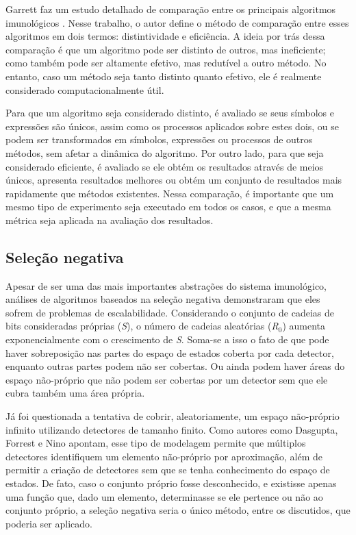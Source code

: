 Garrett faz um estudo detalhado de comparação entre os principais algoritmos imunológicos \cite{Garrett2005}. Nesse trabalho, o autor define o método de comparação entre esses algoritmos em dois termos: distintividade e eficiência. A ideia por trás dessa comparação é que um algoritmo pode ser distinto de outros, mas ineficiente; como também pode ser altamente efetivo, mas redutível a outro método. No entanto, caso um método seja tanto distinto quanto efetivo, ele é realmente considerado computacionalmente útil.

Para que um algoritmo seja considerado distinto, é avaliado se seus símbolos e expressões são únicos, assim como os processos aplicados sobre estes dois, ou se podem ser transformados em símbolos, expressões ou processos de outros métodos, sem afetar a dinâmica do algoritmo. Por outro lado, para que seja considerado eficiente, é avaliado se ele obtém os resultados através de meios únicos, apresenta resultados melhores ou obtém um conjunto de resultados mais rapidamente que métodos existentes. Nessa comparação, é importante que um mesmo tipo de experimento seja executado em todos os casos, e que a mesma métrica seja aplicada na avaliação dos resultados.

\subsection{Seleção negativa}

Apesar de ser uma das mais importantes abstrações do sistema imunológico, análises de algoritmos baseados na seleção negativa demonstraram que eles sofrem de problemas de escalabilidade. Considerando o conjunto de cadeias de bits consideradas próprias (\emph{S}), o número de cadeias aleatórias (\emph{R$_{0}$}) aumenta exponencialmente com o crescimento de \emph{S}. Soma-se a isso o fato de que pode haver sobreposição nas partes do espaço de estados coberta por cada detector, enquanto outras partes podem não ser cobertas. Ou ainda podem haver áreas do espaço não-próprio que não podem ser cobertas por um detector sem que ele cubra também uma área própria.

Já foi questionada a tentativa de cobrir, aleatoriamente, um espaço não-próprio infinito utilizando detectores de tamanho finito. Como autores como Dasgupta, Forrest e Nino apontam, esse tipo de modelagem permite que múltiplos detectores identifiquem um elemento não-próprio por aproximação, além de permitir a criação de detectores sem que se tenha conhecimento do espaço de estados. De fato, caso o conjunto próprio fosse desconhecido, e existisse apenas uma função que, dado um elemento, determinasse se ele pertence ou não ao conjunto próprio, a seleção negativa seria o único método, entre os discutidos, que poderia ser aplicado.

